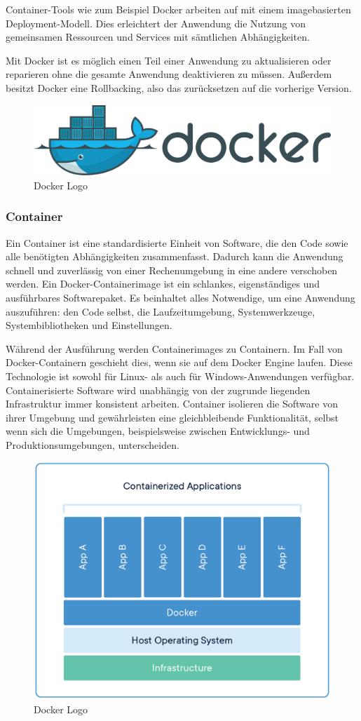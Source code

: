 Container-Tools wie zum Beispiel Docker arbeiten auf mit einem imagebasierten Deployment-Modell. Dies erleichtert der Anwendung die Nutzung von gemeinsamen Ressourcen und Services mit sämtlichen Abhängigkeiten.

Mit Docker ist es möglich einen Teil einer Anwendung zu aktualisieren oder reparieren ohne die gesamte Anwendung deaktivieren zu müssen. Außerdem besitzt Docker eine Rollbacking, also das zurücksetzen auf die vorherige Version.

\begin{figure}[h!]
    \centering
    \includegraphics[width=0.7\linewidth]{pics/docker-logo.png}
    \caption{Docker Logo}
    \label{fig:enter-label}
\end{figure}

\subsubsection{Container}
Ein Container ist eine standardisierte Einheit von Software, die den Code sowie alle benötigten Abhängigkeiten zusammenfasst. Dadurch kann die Anwendung schnell und zuverlässig von einer Rechenumgebung in eine andere verschoben werden. Ein Docker-Containerimage ist ein schlankes, eigenständiges und ausführbares Softwarepaket. Es beinhaltet alles Notwendige, um eine Anwendung auszuführen: den Code selbst, die Laufzeitumgebung, Systemwerkzeuge, Systembibliotheken und Einstellungen.\newline

Während der Ausführung werden Containerimages zu Containern. Im Fall von Docker-Containern geschieht dies, wenn sie auf dem Docker Engine laufen. Diese Technologie ist sowohl für Linux- als auch für Windows-Anwendungen verfügbar. Containerisierte Software wird unabhängig von der zugrunde liegenden Infrastruktur immer konsistent arbeiten. Container isolieren die Software von ihrer Umgebung und gewährleisten eine gleichbleibende Funktionalität, selbst wenn sich die Umgebungen, beispielsweise zwischen Entwicklungs- und Produktionsumgebungen, unterscheiden.

\begin{figure}[h!]
    \centering
    \includegraphics[width=0.7\linewidth]{pics/docker-container.png}
    \caption{Docker Logo}
    \label{fig:enter-label}
\end{figure}

\cite{Vorteile_Nachteile_Docker}
\cite{Was_ist_Docker}




